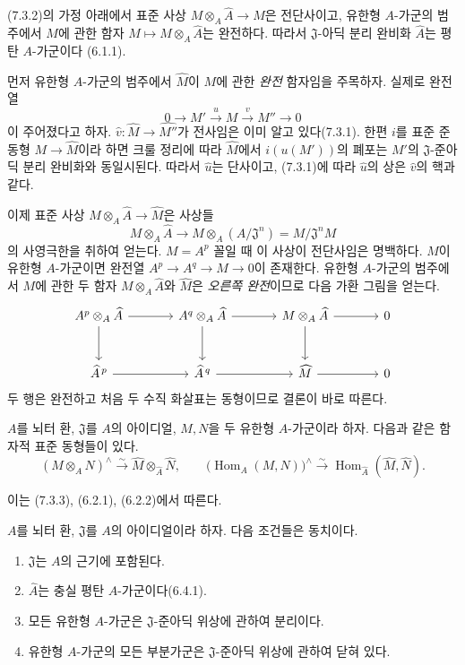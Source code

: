 \begin{corollary}[7.3.3]
\label{0.7.3.3-ko}
(7.3.2)의 가정 아래에서 표준 사상
$M\otimes_A\widehat A\to\widehat M$은 전단사이고, 유한형
$A$-가군의 범주에서 $M$에 관한 함자
$M\mapsto M\otimes_A\widehat A$는 완전하다. 따라서
$\mathfrak J$-아딕 분리 완비화 $\widehat A$는 평탄 $A$-가군이다
(6.1.1).
\end{corollary}

먼저 유한형 $A$-가군의 범주에서 $\widehat M$이 $M$에 관한
\emph{완전} 함자임을 주목하자. 실제로 완전열
\[
  0\to M'\xrightarrow{u}M\xrightarrow{v}M''\to0
\]
이 주어졌다고 하자. $\widehat v:\widehat M\to\widehat{M''}$가
전사임은 이미 알고 있다(7.3.1). 한편 $i$를 표준 준동형
$M\to\widehat M$이라 하면 크룰 정리에 따라 $\widehat M$에서
$i(u(M'))$의 폐포는 $M'$의 $\mathfrak J$-준아딕 분리 완비화와
동일시된다. 따라서 $\widehat u$는 단사이고, (7.3.1)에 따라
$\widehat u$의 상은 $\widehat v$의 핵과 같다.

이제 표준 사상 $M\otimes_A\widehat A\to\widehat M$은 사상들
\[
  M\otimes_A\widehat A\to
  M\otimes_A(A/\mathfrak J^n)=M/\mathfrak J^nM
\]
의 사영극한을 취하여 얻는다. $M=A^p$ 꼴일 때 이 사상이
전단사임은 명백하다. $M$이 유한형 $A$-가군이면 완전열
$A^p\to A^q\to M\to0$이 존재한다. 유한형 $A$-가군의 범주에서
$M$에 관한 두 함자 $M\otimes_A\widehat A$와 $\widehat M$은
\emph{오른쪽 완전}이므로 다음 가환 그림을 얻는다.
\[
\begin{tikzcd}[column sep=large,row sep=large]
  A^p\otimes_A\widehat A \arrow[r] \arrow[d] &
  A^q\otimes_A\widehat A \arrow[r] \arrow[d] &
  M\otimes_A\widehat A \arrow[r] \arrow[d] &
  0 \\
  \widehat A^{\,p} \arrow[r] &
  \widehat A^{\,q} \arrow[r] &
  \widehat M \arrow[r] &
  0
\end{tikzcd}
\]
두 행은 완전하고 처음 두 수직 화살표는 동형이므로 결론이 바로
따른다.

\begin{corollary}[7.3.4]
\label{0.7.3.4-ko}
$A$를 뇌터 환, $\mathfrak J$를 $A$의 아이디얼, $M,N$을 두 유한형
$A$-가군이라 하자. 다음과 같은 함자적 표준 동형들이 있다.
\[
  (M\otimes_A N)^\wedge
  \xrightarrow{\sim}
  \widehat M\otimes_{\widehat A}\widehat N,
  \qquad
  \bigl(\operatorname{Hom}_A(M,N)\bigr)^\wedge
  \xrightarrow{\sim}
  \operatorname{Hom}_{\widehat A}(\widehat M,\widehat N).
\]
\end{corollary}

이는 (7.3.3), (6.2.1), (6.2.2)에서 따른다.

\begin{corollary}[7.3.5]
\label{0.7.3.5-ko}
$A$를 뇌터 환, $\mathfrak J$를 $A$의 아이디얼이라 하자. 다음
조건들은 동치이다.
\begin{enumerate}
  \item[$a)$] $\mathfrak J$는 $A$의 근기에 포함된다.
  \item[$b)$] $\widehat A$는 충실 평탄 $A$-가군이다(6.4.1).
  \item[$c)$] 모든 유한형 $A$-가군은 $\mathfrak J$-준아딕 위상에
    관하여 분리이다.
  \item[$d)$] 유한형 $A$-가군의 모든 부분가군은
    $\mathfrak J$-준아딕 위상에 관하여 닫혀 있다.
\end{enumerate}
\end{corollary}

